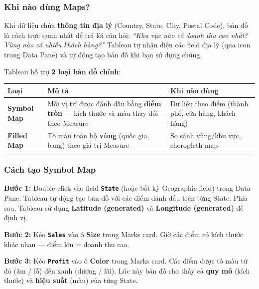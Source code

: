 \documentclass[12pt]{article}
\begin{document}
\subsubsection{Khi nào dùng Maps?}

\noindent Khi dữ liệu chứa \textbf{thông tin địa lý} (Country, State, City, Postal Code), bản đồ là cách trực quan nhất để trả lời câu hỏi: \textit{``Khu vực nào có doanh thu cao nhất? Vùng nào có nhiều khách hàng?''} Tableau tự nhận diện các field địa lý (qua icon  trong Data Pane) và tự động tạo bản đồ khi bạn sử dụng chúng.

\noindent Tableau hỗ trợ \textbf{2 loại bản đồ chính}:

\begin{center}
\renewcommand{\arraystretch}{1.4}
\begin{tabularx}{\linewidth}{l X X}
\toprule
\textbf{Loại} & \textbf{Mô tả} & \textbf{Khi nào dùng} \\
\midrule
\textbf{Symbol Map} & Mỗi vị trí được đánh dấu bằng \textbf{điểm tròn} --- kích thước và màu thay đổi theo Measure & Dữ liệu theo điểm (thành phố, cửa hàng, khách hàng) \\
\textbf{Filled Map} & Tô màu toàn bộ \textbf{vùng} (quốc gia, bang) theo giá trị Measure & So sánh vùng/khu vực, choropleth map \\
\bottomrule
\end{tabularx}
\end{center}

\subsubsection{Cách tạo Symbol Map}

\noindent \textbf{Bước 1:} Double-click vào field \textbf{\texttt{State}} (hoặc bất kỳ Geographic field) trong Data Pane. Tableau tự động tạo bản đồ với các điểm đánh dấu trên từng State. Phía sau, Tableau sử dụng \textbf{Latitude (generated)} và \textbf{Longitude (generated)} để định vị.

\noindent \textbf{Bước 2:} Kéo \textbf{\texttt{Sales}} vào ô \textbf{Size} trong Marks card. Giờ các điểm có kích thước khác nhau --- điểm lớn = doanh thu cao.

\noindent \textbf{Bước 3:} Kéo \textbf{\texttt{Profit}} vào ô \textbf{Color} trong Marks card. Các điểm được tô màu từ đỏ (âm / lỗ) đến xanh (dương / lãi). Lúc này bản đồ cho thấy cả \textbf{quy mô} (kích thước) và \textbf{hiệu suất} (màu) của từng State.
\end{document}
